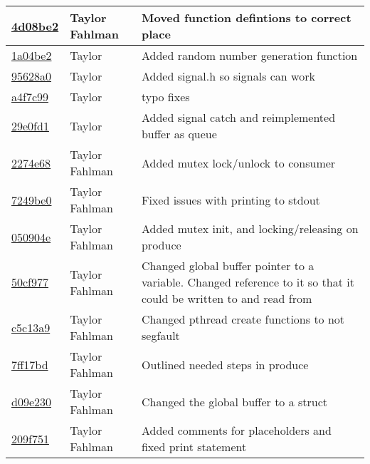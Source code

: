 \begin{tabular}{l l l}
\href{git@github.com:fahlmant/cs444/commit/4d08be28f8900f197846be9ac81d7c0d4c45cc03}{4d08be2} & Taylor Fahlman & Moved function defintions to correct place\\\hline
\href{git@github.com:fahlmant/cs444/commit/1a04be2d025bdf2f264d2fdcd2dad95ded4fb324}{1a04be2} & Taylor & Added random number generation function\\\hline
\href{git@github.com:fahlmant/cs444/commit/95628a0549663a27c0a3ef1f04118db28e89acda}{95628a0} & Taylor & Added signal.h so signals can work\\\hline
\href{git@github.com:fahlmant/cs444/commit/a4f7c992ec397d9b510126246137537b77e55930}{a4f7c99} & Taylor & typo fixes\\\hline
\href{git@github.com:fahlmant/cs444/commit/29e0fd1c29a38fec3bd5a999d8bf8efa513c70fd}{29e0fd1} & Taylor & Added signal catch and reimplemented buffer as queue\\\hline
\href{git@github.com:fahlmant/cs444/commit/2274e684608cf836dc48bda6d3ec5d5d9b66f5fb}{2274e68} & Taylor Fahlman & Added mutex lock/unlock to consumer\\\hline
\href{git@github.com:fahlmant/cs444/commit/7249be01ba7edbda6723b5acbe59f46efa2886a9}{7249be0} & Taylor Fahlman & Fixed issues with printing to stdout\\\hline
\href{git@github.com:fahlmant/cs444/commit/050904eeb0342d93e297fec347a08544cc99ce07}{050904e} & Taylor Fahlman & Added mutex init, and locking/releasing on produce\\\hline
\href{git@github.com:fahlmant/cs444/commit/50cf97754d7e3aa081ef30f56af307d2671969ff}{50cf977} & Taylor Fahlman & Changed global buffer pointer to a variable. Changed reference to it so that it could be written to and read from\\\hline
\href{git@github.com:fahlmant/cs444/commit/c5c13a973ba6f8363baf95b9e2330ea4dca16651}{c5c13a9} & Taylor Fahlman & Changed pthread create functions to not segfault\\\hline
\href{git@github.com:fahlmant/cs444/commit/7ff17bdada1706eb1057ba678bde47c8f5b18774}{7ff17bd} & Taylor Fahlman & Outlined needed steps in produce\\\hline
\href{git@github.com:fahlmant/cs444/commit/d09e23095844c4b70beb8f084938a6716eb11f24}{d09e230} & Taylor Fahlman & Changed the global buffer to a struct\\\hline
\href{git@github.com:fahlmant/cs444/commit/209f7513f40020a3ae61565dd7f115b7c72b8472}{209f751} & Taylor Fahlman & Added comments for placeholders and fixed print statement\\\hline

\end{tabular}
